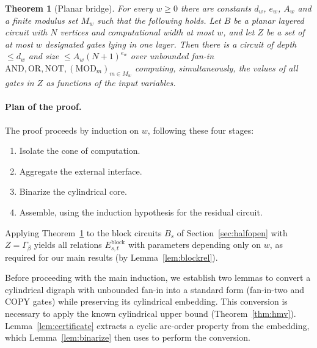\documentclass[11pt]{article}
\newtheorem{theorem}{Theorem}[section]
\theoremstyle{definition}
\theoremstyle{remark}
\begin{document}
\begin{theorem}[Planar bridge]\label{thm:bridge}
For every $w\ge 0$ there are constants $d_w$, $e_w$, $A_w$ and a finite modulus set $M_w$ such that the following holds. Let $B$ be a planar layered circuit with $N$ vertices and computational width at most $w$, and let $Z$ be a set of at most $w$ designated gates lying in one layer. Then there is a circuit of depth $\le d_w$ and size $\le A_w(N+1)^{e_w}$ over unbounded fan-in $\mathrm{AND},\mathrm{OR},\mathrm{NOT},(\mathrm{MOD}_m)_{m\in M_w}$ computing, simultaneously, the values of all gates in $Z$ as functions of the input variables.
\end{theorem}

\paragraph{Plan of the proof.} The proof proceeds by induction on $w$, following these four stages:
\begin{enumerate}
    \item Isolate the cone of computation.
    \item Aggregate the external interface.
    \item Binarize the cylindrical core.
    \item Assemble, using the induction hypothesis for the residual circuit.
\end{enumerate}

Applying Theorem~\ref{thm:bridge} to the block circuits $B_s$ of Section~\ref{sec:halfopen} with $Z=\Gamma_\beta$ yields all relations $E^{\mathrm{block}}_{s,t}$ with parameters depending only on $w$, as required for our main results (by Lemma~\ref{lem:blockrel}).

Before proceeding with the main induction, we establish two lemmas to convert a cylindrical digraph with unbounded fan-in into a standard form (fan-in-two and $\mathrm{COPY}$ gates) while preserving its cylindrical embedding. This conversion is necessary to apply the known cylindrical upper bound (Theorem~\ref{thm:hmv}). Lemma~\ref{lem:certificate} extracts a cyclic arc-order property from the embedding, which Lemma~\ref{lem:binarize} then uses to perform the conversion.
\end{document}
